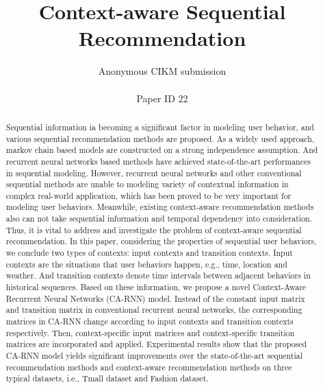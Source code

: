 \documentclass{sig-alternate}
\begin{document}
\title{Context-aware Sequential Recommendation}

\author{
        Anonymous CIKM submission\\
        \\
        Paper ID 22
       }
\maketitle


\begin{abstract}
Sequential information ia becoming a significant factor in modeling user behavior, and various sequential recommendation methods are proposed. As a widely used approach, markov chain based models are constructed on a strong independence assumption. And recurrent neural networks based methods have achieved state-of-the-art performances in sequential modeling. However, recurrent neural networks and other conventional sequential methods are unable to modeling variety of contextual information in complex real-world application, which has been proved to be very important for modeling user behaviors. Meanwhile, existing context-aware recommendation methods also can not take sequential information and temporal dependency into consideration. Thus, it is vital to address and investigate the problem of context-aware sequential recommendation. In this paper, considering the properties of sequential user behaviors, we conclude two types of contexts: input contexts and transition contexts. Input contexts are the situations that user behaviors happen, e.g., time, location and weather. And transition contexts denote time intervals between adjacent behaviors in historical sequences. Based on these information, we propose a novel Context-Aware Recurrent Neural Networks (CA-RNN) model. Instead of the constant input matrix and transition matrix in conventional recurrent neural networks, the corresponding matrices in CA-RNN change according to input contexts and transition contexts respectively. Then, context-specific input matrices and context-specific transition matrices are incorporated and applied. Experimental results show that the proposed CA-RNN model yields significant improvements over the state-of-the-art sequential recommendation methods and context-aware recommendation methods on three typical datasets, i.e., Tmall dataset and Fashion dataset.
\end{abstract}

\end{document}
